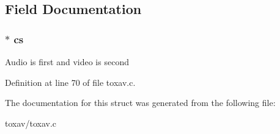 \subsection{Field Documentation}
\hypertarget{struct___tox_av_call_ae88a02b5082b346e4c90541186364e99}{
\subsubsection[{cs}]{$\ast$ cs}}\label{struct___tox_av_call_ae88a02b5082b346e4c90541186364e99}
Audio is first and video is second 

Definition at line 70 of file toxav.\+c.



The documentation for this struct was generated from the following file\+:\begin{DoxyCompactItemize}
\item 
toxav/toxav.\+c\end{DoxyCompactItemize}
